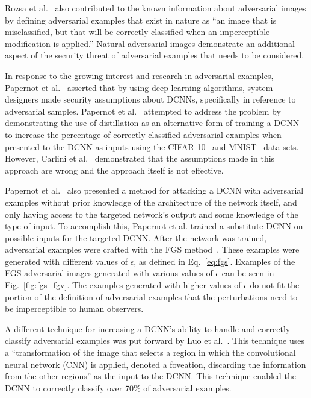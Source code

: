 \documentclass[conference]{IEEEtran}
\begin{document}
Rozsa et al.~\cite{c2} also contributed to the known information about adversarial images by defining adversarial examples that exist in nature as ``an image that is misclassified, but that will be correctly classified when an imperceptible modification is applied.''  Natural adversarial images demonstrate an additional aspect of the security threat of adversarial examples that needs to be considered.  

In response to the growing interest and research in adversarial examples, Papernot et al.~\cite{c3} asserted that by using deep learning algorithms, system designers made security assumptions about DCNNs, specifically in reference to adversarial samples.   Papernot et al.~\cite{c3} attempted to address the problem by demonstrating the use of distillation as an alternative form of training a DCNN to increase the percentage of correctly classified adversarial examples when presented to the DCNN as inputs using the CIFAR-10~\cite{c11} and MNIST~\cite{c9} data sets.  However, Carlini et al.~\cite{c23} demonstrated that the assumptions made in this approach are wrong and the approach itself is not effective.  

Papernot et al.~\cite{c12} also presented a method for attacking a DCNN with adversarial examples without prior knowledge of the architecture of the network itself, and only having access to the targeted network's output and some knowledge of the type of input.  To accomplish this, Papernot et al. trained a substitute DCNN on possible inputs for the targeted DCNN.  After the network was trained, adversarial examples were crafted with the FGS method~\cite{c5}.  These examples were generated with different values of \(\epsilon\), as defined in Eq.~\ref{eq:fgs}.  Examples of the FGS adversarial images generated with various values of \(\epsilon\) can be seen in Fig.~\ref{fig:fgs_fgv}.  The examples generated with higher values of \(\epsilon\) do not fit the portion of the definition of adversarial examples that the perturbations need to be imperceptible to human observers.

A different technique for increasing a DCNN's ability to handle and correctly classify adversarial examples was put forward by Luo et al.~\cite{c15}.  This technique uses a ``transformation of the image that selects a region in which the convolutional neural network (CNN) is applied, denoted a foveation, discarding the information from the other regions'' as the input to the DCNN.  This technique enabled the DCNN to correctly classify over 70\% of adversarial examples.
\end{document}
